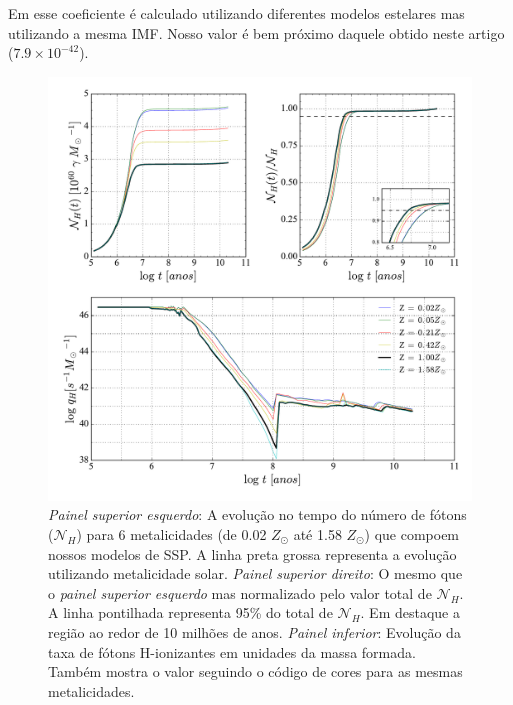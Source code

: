 Em \citet{Kennicutt.1998a} esse coeficiente é calculado utilizando diferentes modelos estelares mas
utilizando a mesma IMF. Nosso valor é bem próximo daquele obtido neste artigo ($7.9 \times
10^{-42}$). 

\begin{figure}
	\centering
	\includegraphics[scale=0.62]{figuras/Nh_logt_metBase_Padova2000_salp.pdf}
	\caption[Evolução temporal do número e da taxa de fótons H-ionizantes em unidades da massa
	formada.] 
	{\emph{Painel superior esquerdo}: A	evolução no tempo do número de fótons ($\mathcal{N}_H$) para 6
metalicidades (de 0.02 $Z_\odot$ até 1.58 $Z_\odot$) que compoem nossos modelos de SSP. A linha
preta grossa representa a evolução utilizando metalicidade solar. \emph{Painel superior direito}:
O mesmo que o \emph{painel superior esquerdo} mas normalizado pelo valor total de $\mathcal{N}_H$.
A linha pontilhada representa 95\% do total de $\mathcal{N}_H$. Em destaque a região ao redor de 10
milhões de anos. \emph{Painel inferior}: Evolução da taxa de fótons H-ionizantes em unidades da
massa formada.
Também mostra o valor seguindo o código de cores para as mesmas metalicidades.}
	\label{fig:Nh_qh}
\end{figure}
 
